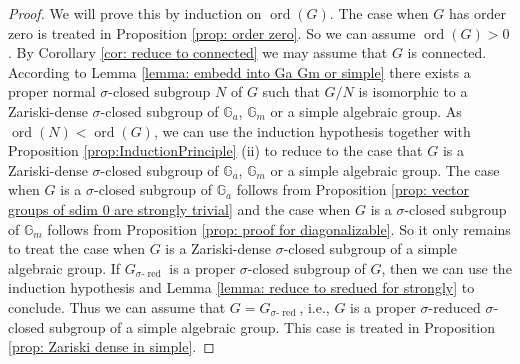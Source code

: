 \documentclass[10pt,a4paper]{amsart}
\newcommand{\Ga}{\mathbb{G}_a}
\newcommand{\Gm}{\mathbb{G}_m}
\newcommand{\G}{\ensuremath{\mathcal{G}}}
\newcommand{\ord}{\operatorname{ord}}
\newcommand{\sred}{{\sigma\text{-}\operatorname{red}}}
\newcommand{\s}{\ensuremath{\sigma}}
\begin{document}
\begin{proof}
	We will prove this by induction on $\ord(G)$.
	The case when $G$ has order zero is treated in Proposition \ref{prop: order zero}. So we can assume $\ord(G)>0$.
	By Corollary \ref{cor: reduce to connected} we may assume that $G$ is connected. 
	According to Lemma \ref{lemma: embedd into Ga Gm or simple} there exists a proper normal $\s$-closed subgroup $N$ of $G$ such that $G/N$ is isomorphic to a Zariski-dense $\s$-closed subgroup of $\Ga$, $\Gm$ or a simple algebraic group. 
	As $\ord(N)<\ord(G)$, we can use the induction hypothesis together with Proposition \ref{prop:InductionPrinciple} (ii) to reduce to the case that $G$ is a Zariski-dense $\s$-closed subgroup of $\Ga$, $\Gm$ or a simple algebraic group. The case when $G$ is a $\s$-closed subgroup of $\Ga$ follows from Proposition \ref{prop: vector groups of sdim 0 are strongly trivial} and the case when $G$ is a $\s$-closed subgroup of $\Gm$ follows from Proposition \ref{prop: proof for diagonalizable}. So it only remains to treat the case when $G$ is a Zariski-dense $\s$-closed subgroup of a simple algebraic group. If $G_\sred$ is a proper $\s$-closed subgroup of $G$, then we can use the induction hypothesis and Lemma \ref{lemma: reduce to sredued for strongly} to conclude. Thus we can assume that $G=G_\sred$, i.e., $G$ is a proper $\s$-reduced $\s$-closed subgroup of a simple algebraic group. This case is treated in Proposition \ref{prop: Zariski dense in simple}.	
%	
%	
%	
%	
%	
%	
%	
%	
%	

\end{proof}
\end{document}
